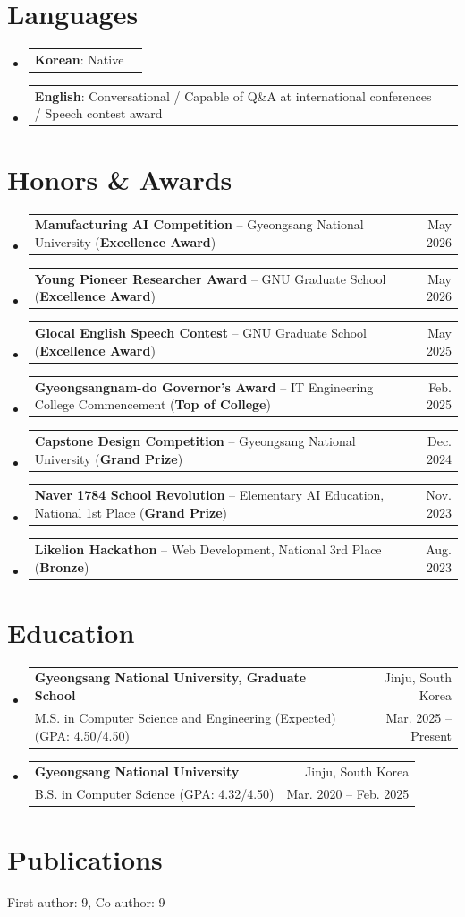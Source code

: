 \documentclass[letterpaper,11pt]{article}
\makeatletter
\newcommand{\resumeSubheading}[4]{
  \vspace{-1pt}\item
    \begin{tabular*}{0.97\textwidth}[t]{l@{\extracolsep{\fill}}r}
      \textbf{#1} & {\small #2} \\
      {\small #3} & {\small #4} \\
    \end{tabular*}\vspace{-5pt}
}
\newcommand{\resumeSkills}[1]{
  \item\small{
    \begin{tabular*}{0.97\textwidth}[t]{l@{\extracolsep{\fill}}r}
      #1
    \end{tabular*}\vspace{-2pt}
  }
}
\newcommand{\resumeSubHeadingListStart}{\begin{itemize}[leftmargin=*]}
\newcommand{\resumeSubHeadingListEnd}{\end{itemize}}
\makeatother
\begin{document}
\section{Languages}
\resumeSubHeadingListStart
\resumeSkills{\textbf{Korean}: Native}
\resumeSkills{\textbf{English}: Conversational / Capable of Q\&A at international conferences / Speech contest award}
\resumeSubHeadingListEnd

\section{Honors \& Awards}
\resumeSubHeadingListStart
\resumeSkills{\textbf{Manufacturing AI Competition} -- Gyeongsang National University (\textbf{Excellence Award}) & May 2026}
\resumeSkills{\textbf{Young Pioneer Researcher Award} -- GNU Graduate School (\textbf{Excellence Award}) & May 2026}
\resumeSkills{\textbf{Glocal English Speech Contest} -- GNU Graduate School (\textbf{Excellence Award}) & May 2025}
\resumeSkills{\textbf{Gyeongsangnam-do Governor's Award} -- IT Engineering College Commencement (\textbf{Top of College}) & Feb. 2025}
\resumeSkills{\textbf{Capstone Design Competition} -- Gyeongsang National University (\textbf{Grand Prize}) & Dec. 2024}
\resumeSkills{\textbf{Naver 1784 School Revolution} -- Elementary AI Education, National 1st Place (\textbf{Grand Prize}) & Nov. 2023}
\resumeSkills{\textbf{Likelion Hackathon} -- Web Development, National 3rd Place (\textbf{Bronze}) & Aug. 2023}
\resumeSubHeadingListEnd

\section{Education}
\resumeSubHeadingListStart
\resumeSubheading
{Gyeongsang National University, Graduate School}{Jinju, South Korea}
{M.S. in Computer Science and Engineering (Expected) (GPA: 4.50/4.50)}{Mar. 2025 -- Present}
\resumeSubheading
{Gyeongsang National University}{Jinju, South Korea}
{B.S. in Computer Science (GPA: 4.32/4.50)}{Mar. 2020 -- Feb. 2025}
\resumeSubHeadingListEnd

\section{Publications}
\small First author: 9, Co-author: 9
\end{document}
